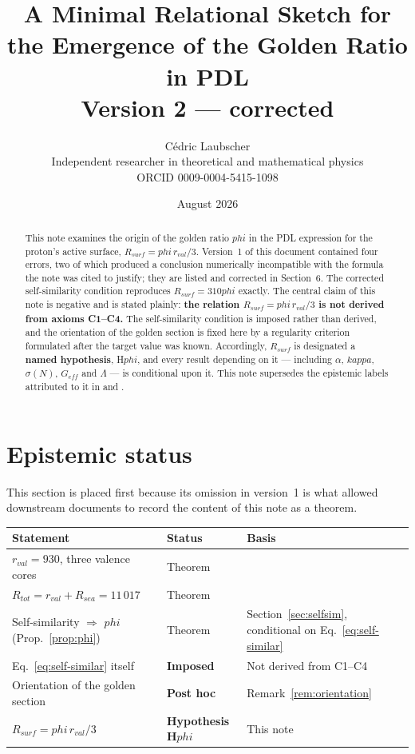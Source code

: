 \documentclass[11pt,a4paper]{article}
\title{A Minimal Relational Sketch for the Emergence of the Golden Ratio in PDL\\
\large Version 2 --- corrected}
\author{C\'edric Laubscher\\
\small Independent researcher in theoretical and mathematical physics\\
\small ORCID 0009-0004-5415-1098}
\date{August 2026}
\def\varphi{phi}%
\def\mathrm#1{#1}%
\def\kappa{kappa}%
\theoremstyle{definition}
\theoremstyle{plain}
\theoremstyle{remark}
\newcommand{\Rsurf}{R_{\mathrm{surf}}}
\newcommand{\Rsea}{R_{\mathrm{sea}}}
\newcommand{\Rtot}{R_{\mathrm{tot}}}
\newcommand{\rval}{r_{\mathrm{val}}}
\begin{document}
\maketitle

\begin{abstract}
This note examines the origin of the golden ratio $\varphi$ in the PDL expression for the proton's active surface, $\Rsurf = \varphi\,\rval/3$. Version~1 of this document contained four errors, two of which produced a conclusion numerically incompatible with the formula the note was cited to justify; they are listed and corrected in Section~6. The corrected self-similarity condition reproduces $\Rsurf = 310\varphi$ exactly. The central claim of this note is negative and is stated plainly: \textbf{the relation $\Rsurf = \varphi\,\rval/3$ is not derived from axioms C1--C4.} The self-similarity condition is imposed rather than derived, and the orientation of the golden section is fixed here by a regularity criterion formulated after the target value was known. Accordingly, $\Rsurf$ is designated a \textbf{named hypothesis}, H$\varphi$, and every result depending on it --- including $\alpha$, $\kappa$, $\sigma(N)$, $G_{\mathrm{eff}}$ and $\Lambda$ --- is conditional upon it. This note supersedes the epistemic labels attributed to it in \citet{PDL_D39} and \citet{PDL_D43}.
\end{abstract}

\section{Epistemic status}
\label{sec:status}

This section is placed first because its omission in version~1 is what allowed downstream documents to record the content of this note as a theorem.

\begin{center}
\begin{tabular}{@{}lll@{}}
\toprule
Statement & Status & Basis \\
\midrule
$\rval = 930$, three valence cores & Theorem & \citet{PDL_D16,PDL_D16a} \\
$\Rtot = \rval + \Rsea = 11\,017$ & Theorem & \citet{PDL_D16a} \\
Self-similarity $\Rightarrow$ $\varphi$ (Prop.~\ref{prop:phi}) & Theorem & Section~\ref{sec:selfsim}, conditional on Eq.~\eqref{eq:self-similar} \\
Eq.~\eqref{eq:self-similar} itself & \textbf{Imposed} & Not derived from C1--C4 \\
Orientation of the golden section & \textbf{Post hoc} & Remark~\ref{rem:orientation} \\
$\Rsurf = \varphi\,\rval/3$ & \textbf{Hypothesis H$\varphi$} & This note \\
\bottomrule
\end{tabular}
\end{center}
\end{document}
